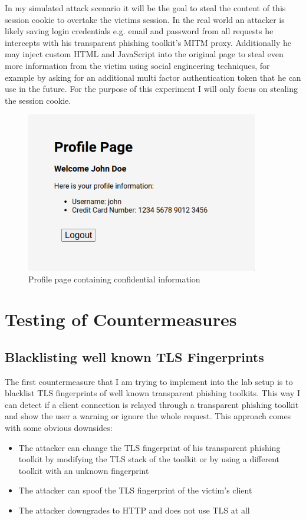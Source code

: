 \documentclass[12pt]{scrbook}
\begin{document}
In my simulated attack scenario it will be the goal to steal the content of
this session cookie to overtake the victims session. In the real world an
attacker is likely saving login credentials e.g. email and password from all
requests he intercepts with his transparent phishing toolkit's MITM proxy.
Additionally he may inject custom HTML and JavaScript into the original page to
steal even more information from the victim using social engineering techniques,
for example by asking for an additional multi factor authentication token that
he can use in the future. For the purpose of this experiment I will only focus
on stealing the session cookie.

\begin{figure}[!htb] \centering
	\includegraphics[height=7cm]{./images/profile_page.png} \caption{Profile page
		containing confidential information} \end{figure}

\newpage \section{Testing of Countermeasures} \subsection{Blacklisting well
	known TLS Fingerprints} The first countermeasure that I am trying to
implement into the lab setup is to blacklist TLS fingerprints of well known
transparent phishing toolkits. This way I can detect if a client connection is
relayed through a transparent phishing toolkit and show the user a warning or
ignore the whole request. This approach comes with some obvious downsides:

\begin{itemize}
	\item The attacker can change the TLS fingerprint of his
	      transparent phishing toolkit by modifying the TLS stack of the toolkit or
	      by using a different toolkit with an unknown fingerprint
	\item The attacker can spoof the TLS fingerprint of the victim's client
	\item The attacker downgrades to HTTP and does not use TLS at all
\end{itemize}
\end{document}
